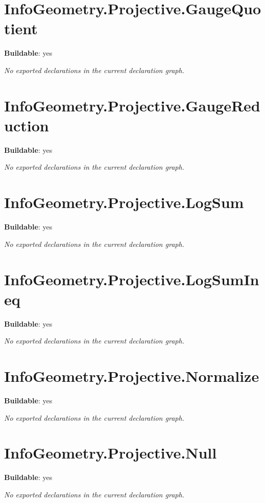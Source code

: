 \section{InfoGeometry.Projective.GaugeQuotient}

\noindent\textbf{Buildable}: yes

\noindent\emph{No exported declarations in the current declaration graph.}

\section{InfoGeometry.Projective.GaugeReduction}

\noindent\textbf{Buildable}: yes

\noindent\emph{No exported declarations in the current declaration graph.}

\section{InfoGeometry.Projective.LogSum}

\noindent\textbf{Buildable}: yes

\noindent\emph{No exported declarations in the current declaration graph.}

\section{InfoGeometry.Projective.LogSumIneq}

\noindent\textbf{Buildable}: yes

\noindent\emph{No exported declarations in the current declaration graph.}

\section{InfoGeometry.Projective.Normalize}

\noindent\textbf{Buildable}: yes

\noindent\emph{No exported declarations in the current declaration graph.}

\section{InfoGeometry.Projective.Null}

\noindent\textbf{Buildable}: yes

\noindent\emph{No exported declarations in the current declaration graph.}

